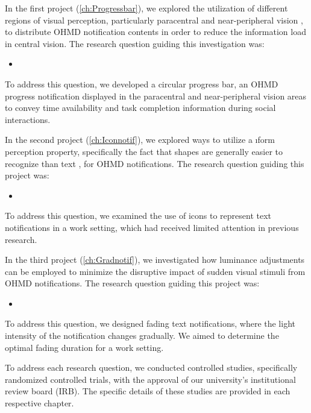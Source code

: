 \vspace*{2mm}
In the first project (\autoref{ch:Progressbar}), we explored the utilization of different regions of visual perception, particularly paracentral and near-peripheral vision \cite{strasburger_peripheral_2011}, to distribute OHMD notification contents in order to reduce the information load in central vision. The research question guiding this investigation was:
\begin{itemize}
    \item \RQMainProgressBar{}
\end{itemize}
To address this question, we developed a circular progress bar, an OHMD progress notification displayed in the paracentral and near-peripheral vision areas to convey time availability and task completion information during social interactions.

\vspace*{4mm}
In the second project (\autoref{ch:Iconnotif}), we explored ways to utilize a \i{form} perception property, specifically the fact that shapes are generally easier to recognize than text  \cite{tijus_design_2007}, for OHMD notifications. The research question guiding this project was:
\begin{itemize}
    \item \RQMainIconNotif{}
\end{itemize}
To address this question, we examined the use of icons to represent text notifications in a work setting, which had received limited attention in previous research.

\vspace*{4mm}
In the third project (\autoref{ch:Gradnotif}), we investigated how luminance adjustments \cite[Ch~3]{ware_information_2013} can be employed to minimize the disruptive impact of sudden visual stimuli from OHMD notifications. The research question guiding this project was:
\begin{itemize}
\item \RQMainGradNotif{}
\end{itemize}
To address this question, we designed fading text notifications, where the light intensity of the notification changes gradually. We aimed to determine the optimal fading duration for a work setting. 

\vspace*{4mm}
To address each research question, we conducted controlled studies, specifically randomized controlled trials, with the approval of our university's institutional review board (IRB). The specific details of these studies are provided in each respective chapter.




